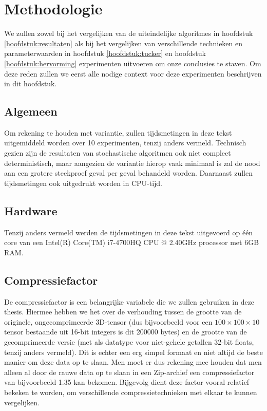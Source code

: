 \chapter{Methodologie}
\label{hoofdstuk:methodologie}

We zullen zowel bij het vergelijken van de uiteindelijke algoritmes in hoofdstuk \ref{hoofdstuk:resultaten} als bij het vergelijken van verschillende technieken en parameterwaarden in hoofdstuk \ref{hoofdstuk:tucker} en hoofdstuk \ref{hoofdstuk:hervorming} experimenten uitvoeren om onze conclusies te staven. Om deze reden zullen we eerst alle nodige context voor deze experimenten beschrijven in dit hoofdstuk.

\section{Algemeen}
Om rekening te houden met variantie, zullen tijdsmetingen in deze tekst uitgemiddeld worden over 10 experimenten, tenzij anders vermeld. Technisch gezien zijn de resultaten van stochastische algoritmen ook niet compleet deterministisch, maar aangezien de variantie hierop vaak minimaal is zal de nood aan een grotere steekproef geval per geval behandeld worden. Daarnaast zullen tijdsmetingen ook uitgedrukt worden in CPU-tijd.

\section{Hardware}
Tenzij anders vermeld werden de tijdsmetingen in deze tekst uitgevoerd op \'e\'en core van een Intel(R) Core(TM) i7-4700HQ CPU @ 2.40GHz processor met 6GB RAM.

\section{Compressiefactor}

De compressiefactor is een belangrijke variabele die we zullen gebruiken in deze thesis. Hiermee hebben we het over de verhouding tussen de grootte van de originele, ongecomprimeerde 3D-tensor (dus bijvoorbeeld voor een $100 \times 100 \times 10$ tensor bestaande uit 16-bit integers is dit 200000 bytes) en de grootte van de gecomprimeerde versie (met als datatype voor niet-gehele getallen 32-bit floats, tenzij anders vermeld). Dit is echter een erg simpel formaat en niet altijd de beste manier om deze data op te slaan. Men moet er dus rekening mee houden dat men alleen al door de rauwe data op te slaan in een Zip-archief een compressiefactor van bijvoorbeeld 1.35 kan bekomen. Bijgevolg dient deze factor vooral relatief bekeken te worden, om verschillende compressietechnieken met elkaar te kunnen vergelijken.\\

